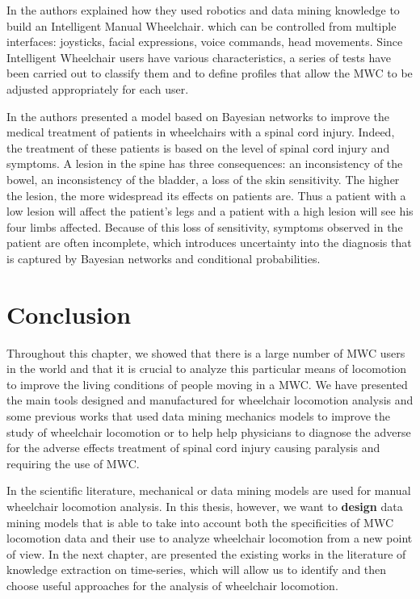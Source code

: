 In \cite{faria2012patient} the authors explained how they used robotics and data mining knowledge to build an Intelligent Manual Wheelchair. which can be controlled from multiple interfaces: joysticks, facial expressions, voice commands, head movements.  Since Intelligent Wheelchair users have various characteristics, a series of tests have been carried out to classify them and to define profiles that allow the MWC to be adjusted appropriately for each user.

In \cite{athanasiou2009bayesian} the authors presented a model based on Bayesian networks to improve the medical treatment of patients in wheelchairs with a spinal cord injury. Indeed, the treatment of these patients  is based on the level of spinal cord injury and symptoms. A lesion in the spine has three consequences: an inconsistency of the bowel, an inconsistency of the bladder, a loss of the skin sensitivity. The higher the lesion, the more widespread its effects on patients are. Thus a patient with a low lesion will affect the patient's legs  and a patient with a high lesion will see his four limbs affected. Because of this loss of sensitivity, symptoms observed in the patient are often incomplete, which introduces uncertainty into the diagnosis that is captured by Bayesian networks and conditional probabilities.





\section{Conclusion}



Throughout this chapter, we showed that there is a large number of MWC users in the world and that it is crucial to analyze this particular means of locomotion to improve the living conditions of people moving in a MWC. We have presented the main tools designed and manufactured for wheelchair locomotion analysis and some previous works that used data mining mechanics models to improve the study of wheelchair locomotion or  to help help physicians to diagnose the adverse for the adverse effects treatment of spinal cord injury causing paralysis and requiring the use of MWC. 


In the scientific literature,  mechanical or data mining models are used for manual wheelchair locomotion analysis.  In this thesis, however, we want to \textbf{design} data mining models that is able to take into account both the specificities of MWC locomotion data and their use to analyze wheelchair locomotion from a new point of view. In the next chapter, are presented the existing works in the literature of knowledge extraction on time-series, which will allow us to identify and then choose  useful approaches for the analysis of wheelchair locomotion.







